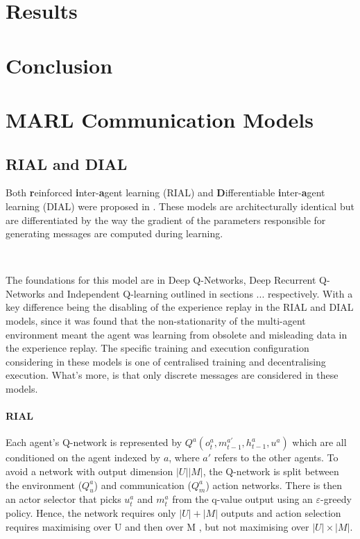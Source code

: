\documentclass{article}
\begin{document}
\section{Results}

\section{Conclusion}

\newpage



\newpage

\appendix

\section{MARL Communication Models} \label{sec:models}
\subsection{RIAL and DIAL}\label{subsec:dial_rial}

Both \textbf{r}einforced \textbf{i}nter-\textbf{a}gent learning (RIAL) and \textbf{D}ifferentiable \textbf{i}nter-\textbf{a}gent learning (DIAL) were proposed in \citet{foerster2016learning}. These models are architecturally identical but are differentiated by the way the gradient of the parameters responsible for generating messages are computed during learning.

\

The foundations for this model are in Deep Q-Networks, Deep Recurrent Q-Networks and Independent Q-learning outlined in sections ... respectively. With a key difference being the disabling of the experience replay in the RIAL and DIAL models, since it was found that the non-stationarity of the multi-agent environment meant the agent was learning from obsolete and misleading data in the experience replay. The specific training and execution configuration considering in these models is one of centralised training and decentralising execution. What's more, is that only discrete messages are considered in these models. 


\paragraph{RIAL} Each agent's Q-network is represented by $Q^a(o_t^a, m_{t-1}^{a'}, h_{t-1}^{a}, u^a)$ which are all conditioned on the agent indexed by $a$, where $a'$ refers to the other agents. To avoid a network with output dimension $|U||M|$, the Q-network is split between the environment ($Q^a_u$) and communication ($Q^a_m$) action networks. There is then an actor selector that picks $u_t^a$ and $m_t^a$ from the q-value output using an $\varepsilon$-greedy policy. Hence, the network requires only $|U| + |M|$ outputs and action selection requires maximising over U and then over M , but not maximising over $|U| \times |M|$.
\end{document}
